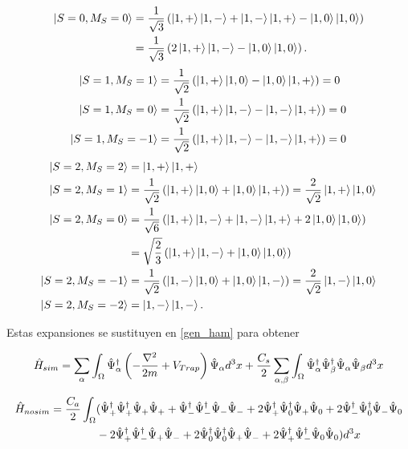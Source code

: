 \begin{align*}
\left|S=0,M_S=0\right\rangle = \frac{1}{\sqrt{3}} &  \left( \left|1,+\right\rangle\left|1,-\right\rangle + \left|1,-\right\rangle\left|1,+\right\rangle - \left|1,0\right\rangle\left|1,0\right\rangle \right) \\ 
 = \frac{1}{\sqrt{3}} & \left( 2\left|1,+\right\rangle\left|1,-\right\rangle - \left|1,0\right\rangle\left|1,0\right\rangle \right).
\end{align*}
\begin{align*}
\left|S=1,M_S=1\right\rangle & = \frac{1}{\sqrt{2}} \left( \left|1,+\right\rangle\left|1,0\right\rangle - \left|1,0\right\rangle\left|1,+\right\rangle \right) = 0\\ 
\left|S=1,M_S=0\right\rangle & = \frac{1}{\sqrt{2}} \left( \left|1,+\right\rangle\left|1,-\right\rangle - \left|1,-\right\rangle\left|1,+\right\rangle \right) = 0\\ 
\left|S=1,M_S=-1\right\rangle & = \frac{1}{\sqrt{2}} \left( \left|1,+\right\rangle\left|1,-\right\rangle - \left|1,-\right\rangle\left|1,+\right\rangle \right) = 0 
\end{align*}
\begin{align*}
\left|S=2,M_S=2\right\rangle & = \left|1,+\right\rangle\left|1,+\right\rangle \\
\left|S=2,M_S=1\right\rangle & = \frac{1}{\sqrt{2}}\left( \left|1,+\right\rangle\left|1,0\right\rangle + \left|1,0\right\rangle\left|1,+\right\rangle \right) = \frac{2}{\sqrt{2}}\left|1,+\right\rangle\left|1,0\right\rangle \\ 
\left|S=2,M_S=0\right\rangle & = \frac{1}{\sqrt{6}}\left( \left|1,+\right\rangle\left|1,-\right\rangle + \left|1,-\right\rangle\left|1,+\right\rangle + 2\left|1,0\right\rangle\left|1,0\right\rangle \right) \\
& = \sqrt{\frac{2}{3}}\left( \left|1,+\right\rangle\left|1,-\right\rangle + \left|1,0\right\rangle\left|1,0\right\rangle \right) \\ 
\left|S=2,M_S=-1\right\rangle & = \frac{1}{\sqrt{2}}\left( \left|1,-\right\rangle\left|1,0\right\rangle + \left|1,0\right\rangle\left|1,-\right\rangle \right) = \frac{2}{\sqrt{2}}\left|1,-\right\rangle\left|1,0\right\rangle \\ 
\left|S=2,M_S=-2\right\rangle & = \left|1,-\right\rangle\left|1,-\right\rangle.
\end{align*}

Estas expansiones se sustituyen en \ref{gen_ham} para obtener

\begin{equation}
\hat{H}_{sim} = \sum_{\alpha} \int_{\Omega} \afc{\alpha} \left( -\frac{\nabla^2}{2m} + V_{Trap} \right) \afa{\alpha} d^3x + \frac{C_s}{2}\sum_{\alpha,\beta}\int_{\Omega} \interact{\alpha}{\beta}{\alpha}{\beta} d^3x
\label{h_sim}
\end{equation}

\begin{equation}
\begin{split}
\hat{H}_{nosim}  = \frac{C_a}{2} \int_{\Omega} & ( \interact{+}{+}{+}{+} + 
\interact{-}{-}{-}{-} + 2\interact{+}{0}{+}{0} + 2\interact{-}{0}{-}{0} \\
& - 2\interact{+}{-}{+}{-} + 2\interact{0}{0}{+}{-} + 2\interact{+}{-}{0}{0} ) d^3x
\end{split}
\label{h_nosim}
\end{equation}

